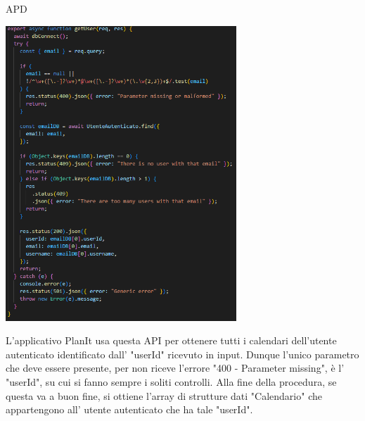 \begin{listaPersonale} {APD}
\begin{listaPersonale2}[APD]{}
                \begin{center}
                    \includegraphics[width=0.65\textwidth, height=0.55\textheight]{img/png/APIs/getUser_email.png}
                \end{center}
                \newpage
                L'applicativo PlanIt usa questa API per ottenere tutti i calendari dell'utente autenticato identificato dall' "userId" ricevuto in input. Dunque l'unico parametro che deve essere presente, per non riceve l'errore "400 - Parameter missing", è l' "userId", su cui si fanno sempre i soliti controlli. Alla fine della procedura, se questa va a buon fine, si ottiene l'array di strutture dati "Calendario" che appartengono all' utente autenticato che ha tale "userId".
                \begin{center}

\end{center}
\end{listaPersonale2}
\end{listaPersonale}
